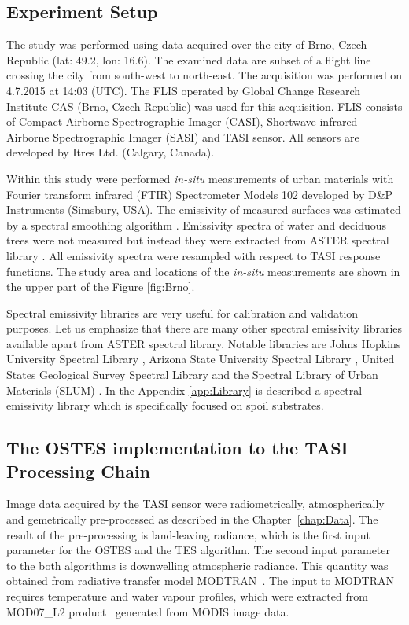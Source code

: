 \subsection*{Experiment Setup}

The study was performed using data acquired over the city of Brno, Czech Republic (lat: 49.2, lon: 16.6). The examined data are subset of a flight line crossing the city from south-west to north-east. The acquisition was performed on 4.7.2015 at 14:03 (UTC). The FLIS operated by Global Change Research Institute CAS (Brno, Czech Republic) \cite{HF14} was used for this acquisition. FLIS consists of Compact Airborne Spectrographic Imager (CASI), Shortwave infrared Airborne Spectrographic Imager (SASI) and TASI sensor. All sensors are developed by Itres Ltd. (Calgary, Canada).

Within this study were performed \textit{in-situ} measurements of urban materials with Fourier transform infrared (FTIR) Spectrometer Models 102 developed by D\&P Instruments (Simsbury, USA). The emissivity of measured surfaces was estimated by a spectral smoothing algorithm \cite{HJ98}. Emissivity spectra of water and deciduous trees were not measured but instead they were extracted from ASTER spectral library \cite{BH09}. All emissivity spectra were resampled with respect to TASI response functions. The study area and locations of the \textit{in-situ} measurements are shown in the upper part of the Figure \ref{fig:Brno}. 

Spectral emissivity libraries are very useful for calibration and validation purposes. Let us emphasize that there are many other spectral emissivity libraries available apart from ASTER spectral library. Notable libraries are Johns Hopkins University Spectral Library \cite{SW91}, Arizona State University Spectral Library \cite{CB00}, United States Geological Survey Spectral Library \cite{CS16} and the Spectral Library of Urban Materials (SLUM) \cite{KS14}. In the Appendix \ref{app:Library} is described a spectral emissivity library which is specifically focused on spoil substrates.

\subsection*{The OSTES implementation to the TASI Processing Chain}

Image data acquired by the TASI sensor were radiometrically, atmospherically and gemetrically pre-processed as described in the Chapter~\ref{chap:Data}. The result of the pre-processing is land-leaving radiance, which is the first input parameter for the OSTES and the TES algorithm. The second input parameter to the both algorithms is downwelling atmospheric radiance. This quantity was obtained from radiative transfer model MODTRAN~\cite{BG06}. The input to MODTRAN requires temperature and water vapour profiles, which were extracted from MOD07\_L2 product~\cite{B11} generated from MODIS image data.

